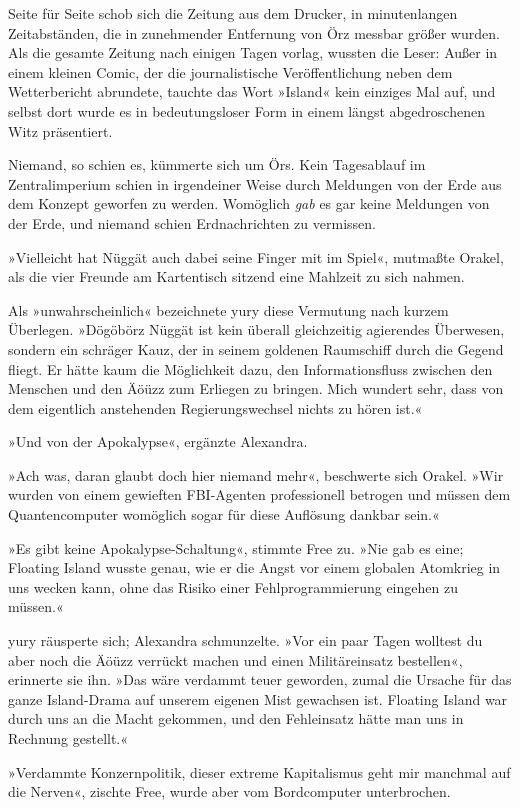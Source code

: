 Seite für Seite schob sich die Zeitung aus dem Drucker, in minutenlangen Zeitabständen, die in zunehmender Entfernung von Örz messbar größer wurden. Als die gesamte Zeitung nach einigen Tagen vorlag, wussten die Leser: Außer in einem kleinen Comic, der die journalistische Veröffentlichung neben dem Wetterbericht abrundete, tauchte das Wort »Island« kein einziges Mal auf, und selbst dort wurde es in bedeutungsloser Form in einem längst abgedroschenen Witz präsentiert.

Niemand, so schien es, kümmerte sich um Örs. Kein Tagesablauf im Zentralimperium schien in irgendeiner Weise durch Meldungen von der Erde aus dem Konzept geworfen zu werden. Womöglich \emph{gab} es gar keine Meldungen von der Erde, und niemand schien Erdnachrichten zu vermissen.

»Vielleicht hat Nüggät auch dabei seine Finger mit im Spiel«, mutmaßte Orakel, als die vier Freunde am Kartentisch sitzend eine Mahlzeit zu sich nahmen.

Als »unwahrscheinlich« bezeichnete yury diese Vermutung nach kurzem Überlegen. »Dögöbörz Nüggät ist kein überall gleichzeitig agierendes Überwesen, sondern ein schräger Kauz, der in seinem goldenen Raumschiff durch die Gegend fliegt. Er hätte kaum die Möglichkeit dazu, den Informationsfluss zwischen den Menschen und den Äöüzz zum Erliegen zu bringen. Mich wundert sehr, dass von dem eigentlich anstehenden Regierungswechsel nichts zu hören ist.«

»Und von der Apokalypse«, ergänzte Alexandra.

»Ach was, daran glaubt doch hier niemand mehr«, beschwerte sich Orakel. »Wir wurden von einem gewieften FBI-Agenten professionell betrogen und müssen dem Quantencomputer womöglich sogar für diese Auflösung dankbar sein.«

»Es gibt keine Apokalypse-Schaltung«, stimmte Free zu. »Nie gab es eine; Floating Island wusste genau, wie er die Angst vor einem globalen Atomkrieg in uns wecken kann, ohne das Risiko einer Fehlprogrammierung eingehen zu müssen.«

yury räusperte sich; Alexandra schmunzelte. »Vor ein paar Tagen wolltest du aber noch die Äöüzz verrückt machen und einen Militäreinsatz bestellen«, erinnerte sie ihn. »Das wäre verdammt teuer geworden, zumal die Ursache für das ganze Island-Drama auf unserem eigenen Mist gewachsen ist. Floating Island war durch uns an die Macht gekommen, und den Fehleinsatz hätte man uns in Rechnung gestellt.«

»Verdammte Konzernpolitik, dieser extreme Kapitalismus geht mir manchmal auf die Nerven«, zischte Free, wurde aber vom Bordcomputer unterbrochen.

